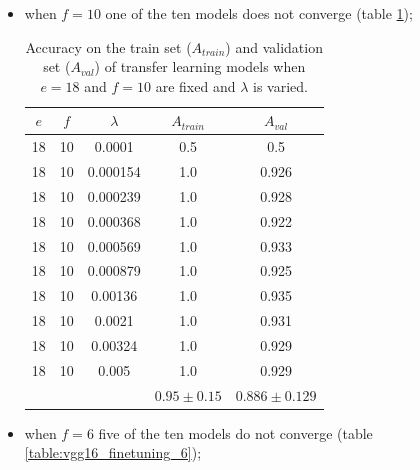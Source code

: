 \begin{itemize}
    \item when $f = 10$ one of the ten models does not converge (table \ref{table:vgg16_finetuning_10});

    \begin{table}[ht]
    \centering
    \begin{tabular}{ |c|c|c|c|c| }
    \hline
    $e$ & $f$ & $\lambda$ & $A_{train}$ & $A_{val}$ \\
    \hline
    18 & 10 & 0.0001 & 0.5 & 0.5 \\
    18 & 10 & 0.000154 & 1.0 & 0.926 \\
    18 & 10 & 0.000239 & 1.0 & 0.928 \\
    18 & 10 & 0.000368 & 1.0 & 0.922 \\
    18 & 10 & 0.000569 & 1.0 & 0.933 \\
    18 & 10 & 0.000879 & 1.0 & 0.925 \\
    18 & 10 & 0.00136 & 1.0 & 0.935 \\
    18 & 10 & 0.0021 & 1.0 & 0.931 \\
    18 & 10 & 0.00324 & 1.0 & 0.929 \\
    18 & 10 & 0.005 & 1.0 & 0.929 \\
    \hline
     & & & $0.95\pm0.15$ & $0.886\pm0.129$ \\
    \hline
    \end{tabular}
    \caption{Accuracy on the train set ($A_{train}$) and validation set ($A_{val}$) of transfer learning models when $e = 18$ and $f = 10$ are fixed and $\lambda$ is varied.}
    \label{table:vgg16_finetuning_10}
    \end{table}

    \item when $f = 6$ five of the ten models do not converge (table \ref{table:vgg16_finetuning_6});


\end{itemize}
